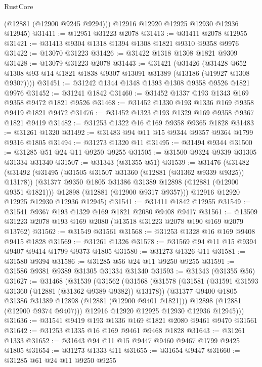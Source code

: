 \begin{lexlean}{RustCore}
\begin{coremodule}
        (@12881 (@12900 @9245 @9294)))
      @12916
      @12920
      @12925
      @12930
      @12936
      @12945)
@31411 := @12951 @31223 @2078
@31413 := @31411 @2078 @12955
@31421 := @31413 @9304 @1318 @1394 @1308 @1821 @9310 @9358 @9976
@31422 := @13070 @31223
@31426 := @31422 @1318 @1308 @1821 @9309
@31428 := @13079 @31223 @2078
@31443 := @31421
    (@31426
      (@31428 @652 @1308 @93 @14 @1821 @1838 @9307 @13091 @31389 (@13186 (@19927 @1308 @9307))))
@31451 := @31242 @1344 @1348 @1393 @1308 @9358 @9526 @1821 @9976
@31452 := @31241 @1842
@31460 := @31452 @1337 @193 @1343 @169 @9358 @9472 @1821 @9526
@31468 := @31452 @1330 @193 @1336 @169 @9358 @9419 @1821 @9472
@31476 := @31452 @1323 @193 @1329 @169 @9358 @9367 @1821 @9419
@31482 := @31253 @1322 @16 @169 @9358 @9365 @1828
@31483 := @31261 @1320
@31492 := @31483 @94 @11 @15 @9344 @9357 @9364 @1799 @9316 @1805
@31494 := @31273 @1320 @11
@31495 := @31494 @9344
@31500 := @31285 @51 @24 @11 @9250 @9255
@31505 := @31500 @9324 @9339 @31305 @31334 @31340
@31507 := @31343 (@31355 @51)
@31539 := @31476
    (@31482
      (@31492
        (@31495 (@31505 @31507 @31360 (@12881 (@31362 @9339 @9325)) @13178))
        (@31377 @9350 @1805 @31386 @31389 @12898 (@12881 (@12900 @9351 @1821)))
        @12898
        (@12881 (@12900 @9317 @9357)))
      @12916
      @12920
      @12925
      @12930
      @12936
      @12945)
@31541 := @31411 @1842 @12955
@31549 := @31541 @9367 @193 @1329 @169 @1821 @2080 @9408 @9417
@31561 := @13509 @31223 @2078 @193 @169 @2080 (@13518 @31223 @2078 @190 @169 @2079 @13762)
@31562 := @31549 @31561
@31568 := @31253 @1328 @16 @169 @9408 @9415 @1828
@31569 := @31261 @1326
@31578 := @31569 @94 @11 @15 @9394 @9407 @9414 @1799 @9373 @1805
@31580 := @31273 @1326 @11
@31581 := @31580 @9394
@31586 := @31285 @56 @24 @11 @9250 @9255
@31591 := @31586 @9381 @9389 @31305 @31334 @31340
@31593 := @31343 (@31355 @56)
@31627 := @31468
    (@31539
      (@31562
        (@31568
          (@31578
            (@31581 (@31591 @31593 @31360 (@12881 (@31362 @9389 @9382)) @13178))
            (@31377 @9400 @1805 @31386 @31389 @12898 (@12881 (@12900 @9401 @1821)))
            @12898
            (@12881 (@12900 @9374 @9407)))
          @12916
          @12920
          @12925
          @12930
          @12936
          @12945)))
@31636 := @31541 @9419 @193 @1336 @169 @1821 @2080 @9461 @9470 @31561
@31642 := @31253 @1335 @16 @169 @9461 @9468 @1828
@31643 := @31261 @1333
@31652 := @31643 @94 @11 @15 @9447 @9460 @9467 @1799 @9425 @1805
@31654 := @31273 @1333 @11
@31655 := @31654 @9447
@31660 := @31285 @61 @24 @11 @9250 @9255

\end{coremodule}
\end{lexlean}

